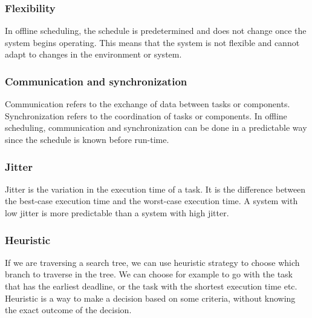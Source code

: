             \subsubsection{\textbf{Flexibility}}
            In offline scheduling, the schedule is predetermined and does not change once the system begins operating. This means that the system is not flexible and cannot adapt to changes in the environment or system.

            \subsubsection{\textbf{Communication and synchronization}}
            Communication refers to the exchange of data between tasks or components. Synchronization refers to the coordination of tasks or components. In offline scheduling, communication and synchronization can be done in a predictable way since the schedule is known before run-time.

            \subsubsection{\textbf{Jitter}}
            Jitter is the variation in the execution time of a task. It is the difference between the best-case execution time and the worst-case execution time. A system with low jitter is more predictable than a system with high jitter.

            \subsubsection{\textbf{Heuristic}}
            If we are traversing a search tree, we can use heuristic strategy to choose which branch to traverse in the tree. We can choose for example to go with the task that has the earliest deadline, or the task with the shortest execution time etc. Heuristic is a way to make a decision based on some criteria, without knowing the exact outcome of the decision.